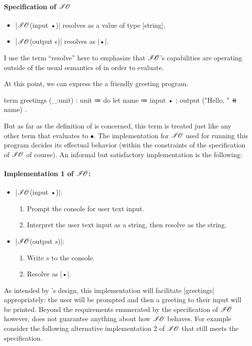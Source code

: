\paragraph{Specification of $\mathscr{I\hspace{-0.1em}O}$}
\begin{itemize}
\item \code|$\mathscr{I\hspace{-0.1em}O}$(input •)| resolves as a value of type \code|string|,
\item \code|$\mathscr{I\hspace{-0.1em}O}$(output s)| resolves as \code|•|.
\end{itemize}
%
I use the term ``resolve'' here to emphasize that $\mathscr{I\hspace{-0.1em}O}$'s capabilities are operating outside of the usual semantics of \LangB in order to evaluate.

At this point, we can express the a friendly greeting program.
\begin{snippet}
term greetings (_:unit) : unit
  ≔ do
      { let name ≔ input •
      ; output ("Hello, " ⧺ name) }.
\end{snippet}
But as far as the definition of \LangB is concerned, this term is treated just like any other term that evaluates to $•$.
The implementation for $\mathscr{I\hspace{-0.1em}O}$ used for running this program decides its effectual behavior (within the constraints of the specification of $\mathscr{I\hspace{-0.1em}O}$ of course).
An informal but satisfactory implementation is the following:

\paragraph{Implementation 1 of $\mathscr{I\hspace{-0.1em}O}$:}
\begin{itemize}
  \item \code|$\mathscr{I\hspace{-0.1em}O}$(input •)|:
  \begin{enumerate}
    \item Prompt the console for user text input.
    \item Interpret the user text input as a string, then resolve as the string.
  \end{enumerate}
  \item \code|$\mathscr{I\hspace{-0.1em}O}$(output $s$)|:
  \begin{enumerate}
    \item Write $s$ to the console.
    \item Resolve as \code|•|.
  \end{enumerate}
\end{itemize}
As intended by \LangB's design, this implementation will facilitate \code|greetings| appropriately: the user will be prompted and then a greeting to their input will be printed.
Beyond the requirements enumerated by the specification of $\mathscr{I\hspace{-0.1em}O}$ however, \LangB does not guarantee anything about how $\mathscr{I\hspace{-0.1em}O}$ behaves.
For example consider the following alternative implementation 2 of $\mathscr{I\hspace{-0.1em}O}$ that still meets the specification.

